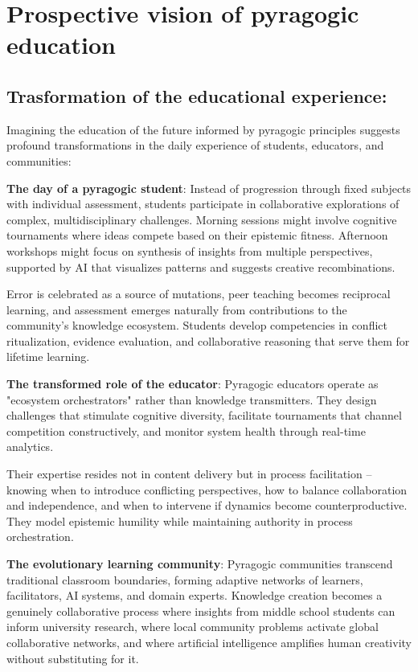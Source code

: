 \section{Prospective vision of pyragogic education}
\subsection*{Trasformation of the educational experience:}

Imagining the education of the future informed by pyragogic principles suggests profound transformations in the daily experience of students, educators, and communities:

\textbf{The day of a pyragogic student}:
Instead of progression through fixed subjects with individual assessment, students participate in collaborative explorations of complex, multidisciplinary challenges. Morning sessions might involve cognitive tournaments where ideas compete based on their epistemic fitness. Afternoon workshops might focus on synthesis of insights from multiple perspectives, supported by AI that visualizes patterns and suggests creative recombinations.

Error is celebrated as a source of mutations, peer teaching becomes reciprocal learning, and assessment emerges naturally from contributions to the community's knowledge ecosystem. Students develop competencies in conflict ritualization, evidence evaluation, and collaborative reasoning that serve them for lifetime learning.

\textbf{The transformed role of the educator}:
Pyragogic educators operate as "ecosystem orchestrators" rather than knowledge transmitters. They design challenges that stimulate cognitive diversity, facilitate tournaments that channel competition constructively, and monitor system health through real-time analytics.

Their expertise resides not in content delivery but in process facilitation -- knowing when to introduce conflicting perspectives, how to balance collaboration and independence, and when to intervene if dynamics become counterproductive. They model epistemic humility while maintaining authority in process orchestration.

\textbf{The evolutionary learning community}:
Pyragogic communities transcend traditional classroom boundaries, forming adaptive networks of learners, facilitators, AI systems, and domain experts. Knowledge creation becomes a genuinely collaborative process where insights from middle school students can inform university research, where local community problems activate global collaborative networks, and where artificial intelligence amplifies human creativity without substituting for it.

